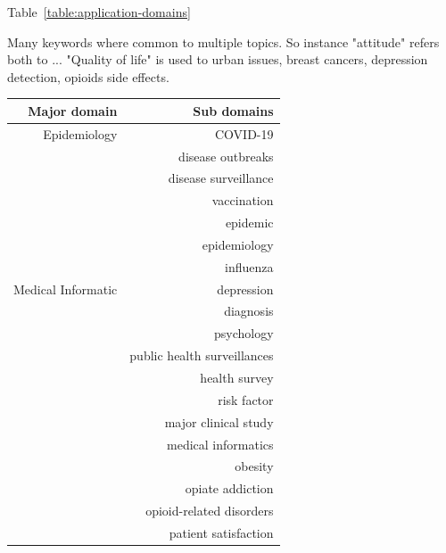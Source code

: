 Table~\ref{table:application-domains}

Many keywords where common to multiple topics. So instance "attitude" refers both to ...
"Quality of life" is used to urban issues, breast cancers, depression detection, opioids side effects.

\begin{center}
    \begin{longtable}{ rr }
        \hline
        Major domain          & Sub domains                     \\ [0.5ex]
        \hline
        Epidemiology          & COVID-19                        \\
                              & disease outbreaks               \\
                              & disease surveillance            \\
                              & vaccination                     \\
                              & epidemic                        \\
                              & epidemiology                    \\
                              & influenza                       \\
        \hline
        Medical Informatic    & depression                      \\
                              & diagnosis                       \\
                              & psychology                      \\
                              & public health surveillances     \\
                              & health survey                   \\
                              & risk factor                     \\
                              & major clinical study            \\
                              & medical informatics             \\
                              & obesity                         \\
                              & opiate addiction                \\
                              & opioid-related disorders        \\
                              & patient satisfaction            \\

\end{longtable}
\end{center}
